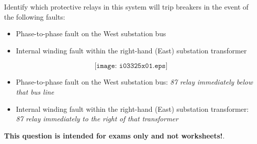 

\noindent
Identify which protective relays in this system will trip breakers in the event of the following faults:

\begin{itemize}
\item{} Phase-to-phase fault on the West substation bus
\vskip 10pt
\item{} Internal winding fault within the right-hand (East) substation transformer
\end{itemize}

$$\texttt{[image: i03325x01.eps]}$$







\begin{itemize}
\item{} Phase-to-phase fault on the West substation bus: {\it 87 relay immediately below that bus line}
\vskip 10pt
\item{} Internal winding fault within the right-hand (East) substation transformer: {\it 87 relay immediately to the right of that transformer}
\end{itemize}







{\bf This question is intended for exams only and not worksheets!}.



